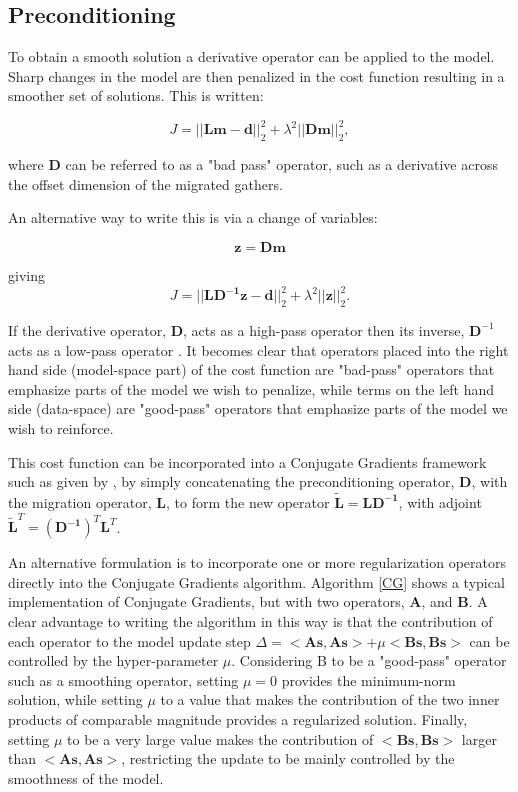 \subsection{Preconditioning}
To obtain a smooth solution a derivative operator can be applied to the model. Sharp changes in the model are then penalized in the cost function resulting in a smoother set of solutions. This is written:

\begin{equation}
J = ||\mathbf{Lm}-\mathbf{d}||^2_2 + \lambda^2|| \mathbf{D} \mathbf{m}||^2_2,
\end{equation}
 
where $\mathbf{D}$ can be referred to as a "bad pass" operator, such as a derivative across the offset dimension of the migrated gathers.

An alternative way to write this is via a change of variables:

\begin{equation}
\mathbf{z} = \mathbf{Dm}
\end{equation}

giving
\begin{equation}
J = ||\mathbf{LD^{-1}\mathbf{z}}-\mathbf{d}||^2_2 + \lambda^2|| \mathbf{z}||^2_2.
\end{equation}

If the derivative operator, $\mathbf{D}$, acts as a high-pass operator then its inverse, $\mathbf{D}^{-1}$ acts as a low-pass operator \citep{juefu}. It becomes clear that operators placed into the right hand side (model-space part) of the cost function are "bad-pass" operators that emphasize parts of the model we wish to penalize, while terms on the left hand side (data-space) are "good-pass" operators that emphasize parts of the model we wish to reinforce.

This cost function can be incorporated into a Conjugate Gradients framework such as given by \citep{scales1987tomographic}, by simply concatenating the preconditioning operator, $\mathbf{D}$, with the migration operator, $\mathbf{L}$, to form the new operator $\widetilde{\mathbf{L}} = \mathbf{L}\mathbf{D^{-1}}$, with adjoint $\widetilde{\mathbf{L}}^T = (\mathbf{D^{-1}})^T\mathbf{L}^T$. 

An alternative formulation is to incorporate one or more regularization operators directly into the Conjugate Gradients algorithm. Algorithm \ref{CG} shows a typical implementation of Conjugate Gradients, but with two operators, $\mathbf{A}$, and $\mathbf{B}$. A clear advantage to writing the algorithm in this way is that the contribution of each operator to the model update step $\Delta = <\mathbf{As},\mathbf{As}> + \mu<\mathbf{Bs},\mathbf{Bs}>$ can be controlled by the hyper-parameter $\mu$. Considering B to be a "good-pass" operator such as a smoothing operator, setting $\mu=0$ provides the minimum-norm solution, while setting $\mu$ to a value that makes the contribution of the two inner products of comparable magnitude provides a regularized solution. Finally, setting $\mu$ to be a very large value makes the contribution of $<\mathbf{Bs},\mathbf{Bs}>$ larger than $<\mathbf{As},\mathbf{As}>$, restricting the update to be mainly controlled by the smoothness of the model.

